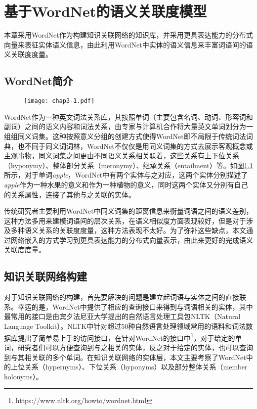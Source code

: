 \chapter{基于WordNet的语义关联度模型}
\label{chap:chap03}
本章采用WordNet作为构建知识关联网络的知识库，并采用更具表达能力的分布式向量来表征实体语义信息，由此利用WordNet中实体的语义信息来丰富词语间的语义关联度度量。

\section{WordNet简介}
\begin{figure}[!ht]
    \centerline{\texttt{[image: chap3-1.pdf]}}
    \label{chap3-1}
\end{figure}

WordNet作为一种英文词法关系库，其按照单词（主要包含名词、动词、形容词和副词）之间的语义内容和词法关系，由专家与计算机合作将大量英文单词划分为一组组同义词集。这种按照意义分组的创建方式使得WordNet即不局限于传统词法词典，也不同于同义词词林，WordNet不仅仅是用同义词集的方式去展示客观概念或主观事物，同义词集之间更由不同语义关系相关联着，这些关系有上下位关系（hyponymy）、整体部分关系（meronymy）、继承关系（entailment）等。如图\ref{chap3-1}所示，对于单词\emph{apple}，WordNet中有两个实体与之对应，这两个实体分别描述了\emph{apple}作为一种水果的意义和作为一种植物的意义，同时这两个实体又分别有自己的关系属性，连接了其他与之关联的实体。

传统研究者\cite{its/Rada89, Leacock98, wu1994verb, tkde/LiBM03}主要利用WordNet中同义词集的距离信息来衡量词语之间的语义差别，这种方法多用来建模词语间的层次关系，在语义相似度方面表现较好，但是对于涉及多种语义关系的关联度度量，这种方法表现不太好。为了弥补这些缺点，本文通过网络嵌入的方式学习到更具表达能力的分布式向量表示，由此来更好的完成语义关联度度量。

\section{知识关联网络构建}
对于知识关联网络的构建，首先要解决的问题是建立起词语与实体之间的直接联系。幸运的是，WordNet中提供了相应的查询接口来得到与词语相关的实体，其中最常用的接口是由宾夕法尼亚大学提出的自然语言处理工具包NLTK（Natural Language Toolkit）\cite{OM/Bird09}。NLTK中针对超过50种自然语言处理领域常用的语料和词法数据库提出了简单易上手的访问接口，在针对WordNet的接口中\footnote{https://www.nltk.org/howto/wordnet.html}，对于给定的单词，研究者们可以方便查询到与之相关的实体，反之对于给定的实体，也可以查询到与其相关联的多个单词。在知识关联网络的实体层，本文主要考察了WordNet中的上位关系（hypernyms）、下位关系（hyponyms）以及部分整体关系（member holonyms）。

